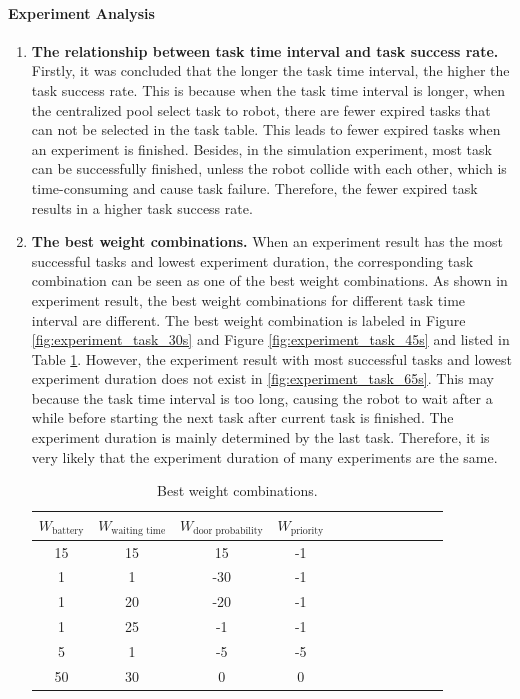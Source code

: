 \paragraph{Experiment Analysis} 
\begin{enumerate}
 \item \textbf{The relationship between task time interval and task success rate.} Firstly, it was concluded that the longer the task time interval, the higher the task success rate.
 This is because when the task time interval is longer, when the centralized pool select task to robot, there are fewer expired tasks that can not be selected in the task table. This leads to fewer expired tasks when an experiment is finished. Besides, in the simulation experiment, most task can be successfully finished, unless the robot collide with each other, which is time-consuming and cause task failure. Therefore, the fewer expired task results in a higher task success rate.
 \item \textbf{The best weight combinations.} When an experiment result has the most successful tasks and lowest experiment duration, the corresponding task combination can be seen as one of the best weight combinations. As shown in experiment result, the best weight combinations for different task time interval are different. 
 The best weight combination is labeled in Figure \ref{fig:experiment_task_30s} and Figure \ref{fig:experiment_task_45s} and listed in Table \ref{tab:best_weight_combinations}. However, the experiment result with most successful tasks and lowest experiment duration does not exist in \ref{fig:experiment_task_65s}. This may because the task time interval is too long, causing the robot to wait after a while before starting the next task after current task is finished. The experiment duration is mainly determined by the last task. Therefore, it is very likely that the experiment duration of many experiments are the same.
\begin{table}
 \centering
 \begin{tabular}{|c|c|c|c|c|c|c|c|c|c|c|c|} 
 \hline
 $W_{\mbox{battery}}$ & $W_{\mbox{waiting time}}$ & $W_{\mbox{door probability}}$ & $W_{\mbox{priority}}$ \\
 \hline
 15 & 15 & 15 & -1 \\ \hline
 1 & 1 & -30 & -1 \\ \hline
 1 & 20& -20 & -1 \\ \hline
 1 & 25& -1 & -1 \\ \hline
 5 & 1 & -5 & -5 \\ \hline
 50 & 30 & 0 & 0 \\ \hline
 \end{tabular}
 \caption{Best weight combinations.}
 \label{tab:best_weight_combinations}
 \end{table}
\end{enumerate}

